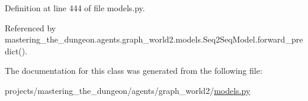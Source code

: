 Definition at line 444 of file models.\+py.



Referenced by mastering\+\_\+the\+\_\+dungeon.\+agents.\+graph\+\_\+world2.\+models.\+Seq2\+Seq\+Model.\+forward\+\_\+predict().



The documentation for this class was generated from the following file\+:\begin{DoxyCompactItemize}
\item 
projects/mastering\+\_\+the\+\_\+dungeon/agents/graph\+\_\+world2/\hyperlink{models_8py}{models.\+py}\end{DoxyCompactItemize}
